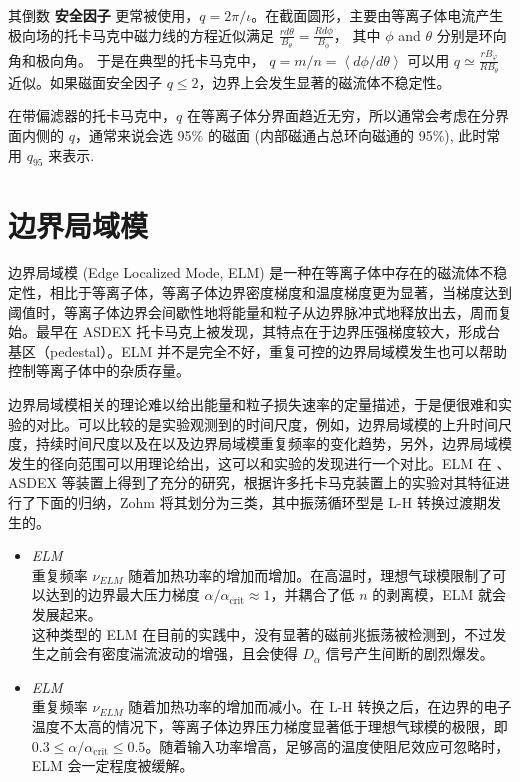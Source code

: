 其倒数 \textbf{安全因子} 更常被使用，$q = 2\pi/\iota$。在截面圆形，主要由等离子体电流产生极向场的托卡马克中磁力线的方程近似满足 $ \frac{r d\theta}{B_\theta} = \frac{Rd\phi}{B_\phi} $，
其中 $ \phi $ and $\theta$ 分别是环向角和极向角。 于是在典型的托卡马克中， $ q = m/n = \left \langle d\phi /d\theta \right \rangle $ 可以用 $ q \simeq \frac{r B_\varphi}{R B_\theta} $ 近似。如果磁面安全因子 $q\leq 2$，边界上会发生显著的磁流体不稳定性。

在带偏滤器的托卡马克中，$q$ 在等离子体分界面趋近无穷，所以通常会考虑在分界面内侧的 $q$，通常来说会选 95\% 的磁面 (内部磁通占总环向磁通的 95\%), 此时常用 $q_{95}$ 来表示.





\section{边界局域模}
边界局域模 (Edge Localized Mode, ELM) 是一种在\Hmode 等离子体中存在的磁流体不稳定性，相比于\Lmode 等离子体，\Hmode 等离子体边界密度梯度和温度梯度更为显著，当梯度达到阈值时，等离子体边界会间歇性地将能量和粒子从边界脉冲式地释放出去，周而复始。\Hmode 最早在 ASDEX 托卡马克上被发现，其特点在于边界压强梯度较大，形成台基区（pedestal）。ELM 并不是完全不好，重复可控的边界局域模发生也可以帮助控制等离子体中的杂质存量。


边界局域模相关的理论难以给出能量和粒子损失速率的定量描述，于是便很难和实验的对比。可以比较的是实验观测到的时间尺度，例如，边界局域模的上升时间尺度，持续时间尺度以及在以及边界局域模重复频率的变化趋势，另外，边界局域模发生的径向范围可以用理论给出，这可以和实验的发现进行一个对比。ELM 在 \ddd、ASDEX 等装置上得到了充分的研究，根据许多托卡马克装置上的实验对其特征进行了下面的归纳，Zohm \cite{zohm_edge_1996} 将其划分为三类，其中振荡循环型是 L-H 转换过渡期发生的。


\begin{itemize}
    \item \textit{\typeone ELM}  \\ 重复频率 $\nu_{ELM}$ 随着加热功率的增加而增加。在高温时，理想气球模限制了可以达到的边界最大压力梯度 $\alpha/\alpha_{\text{crit}}\approx 1$，并耦合了低 $n$ 的剥离模，\typeone ELM 就会发展起来。\\
    这种类型的 ELM 在目前的实践中，没有显著的磁前兆振荡被检测到，不过发生之前会有密度湍流波动的增强，且会使得 $D_\alpha$ 信号产生间断的剧烈爆发。
    \item \textit{\typethr ELM} \\ 重复频率 $\nu_{ELM}$ 随着加热功率的增加而减小。在 L-H 转换之后，在边界的电子温度不太高的情况下，等离子体边界压力梯度显著低于理想气球模的极限，即 $0.3\leq \alpha/\alpha_{\text{crit}}\leq 0.5$。随着输入功率增高，足够高的温度使阻尼效应可忽略时，\typethr ELM 会一定程度被缓解。
\end{itemize}

